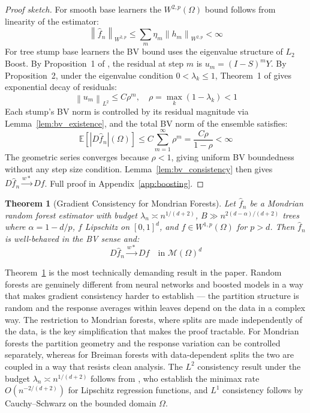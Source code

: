 \documentclass[12pt]{article}
\newtheorem{theorem}{Theorem}
\newcommand{\norm}[1]{\left\| #1 \right\|}
\newcommand{\Wonep}{W^{1,p}(\Omega)}
\newcommand{\Wtwop}{W^{2,p}(\Omega)}
\newcommand{\cM}{\mathcal{M}(\Omega)^d}
\newcommand{\fn}{\hat{f}_n}
\newcommand{\wstar}{\xrightarrow{w*}}
\begin{document}
	\begin{proof}[Proof sketch]
		For smooth base learners the $\Wtwop$ bound follows from linearity of the estimator:
		\begin{equation}
			\norm{\fn}_{W^{2,p}} \leq \sum_m \eta_m \norm{h_m}_{W^{2,p}} < \infty
		\end{equation}
		For tree stump base learners the BV bound uses the eigenvalue structure of
		$L_2$Boost. By Proposition~1 of \citet{buhlmann2003boosting}, the residual at step
		$m$ is $u_m = (I-S)^m Y$. By Proposition~2, under the eigenvalue condition $0 <
		\lambda_k \leq 1$, Theorem~1 of \citet{buhlmann2003boosting} gives exponential decay
		of residuals:
		\begin{equation}
			\norm{u_m}_{L^2} \leq C\rho^m, \quad \rho = \max_k(1-\lambda_k) < 1
		\end{equation}
		Each stump's BV norm is controlled by its residual magnitude via Lemma~\ref{lem:bv_existence},
		and the total BV norm of the ensemble satisfies:
		\begin{equation}
			\mathbb{E}[|D\fn|(\Omega)] \leq C\sum_{m=1}^\infty \rho^m = \frac{C\rho}{1-\rho} < \infty
		\end{equation}
		The geometric series converges because $\rho < 1$, giving uniform BV boundedness
		without any step size condition. Lemma~\ref{lem:bv_consistency} then gives
		$D\fn \xrightarrow{w*} Df$. Full proof in Appendix~\ref{app:boosting}.
	\end{proof}
	
	\begin{theorem}[Gradient Consistency for Mondrian Forests]
		\label{thm:forests}
		Let $\fn$ be a Mondrian random forest estimator with budget $\lambda_n \asymp
		n^{1/(d+2)}$, $B \gg n^{2(d-\alpha)/(d+2)}$ trees where $\alpha = 1 - d/p$, $f$
		Lipschitz on $[0,1]^d$, and $f \in \Wonep$ for $p > d$. Then $\fn$ is well-behaved
		in the BV sense and:
		\begin{equation}
			D\fn \wstar Df \quad \text{in } \cM
		\end{equation}
	\end{theorem}
	
	Theorem~\ref{thm:forests} is the most technically demanding result in the paper.
	Random forests are genuinely different from neural networks and boosted models in a
	way that makes gradient consistency harder to establish --- the partition structure is
	random and the response averages within leaves depend on the data in a complex way.
	The restriction to Mondrian forests, where splits are made independently of the data,
	is the key simplification that makes the proof tractable. For Mondrian forests the
	partition geometry and the response variation can be controlled separately, whereas for
	Breiman forests with data-dependent splits the two are coupled in a way that resists
	clean analysis. The $L^2$ consistency result under the budget $\lambda_n \asymp
	n^{1/(d+2)}$ follows from \citet{mourtada2017mondrian}, who establish the minimax rate
	$O(n^{-2/(d+2)})$ for Lipschitz regression functions, and $L^1$ consistency follows
	by Cauchy--Schwarz on the bounded domain $\Omega$.
	
\end{document}
